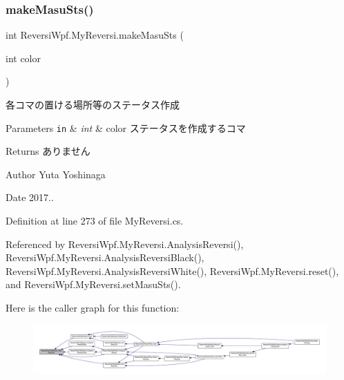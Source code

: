 \subsubsection{\texorpdfstring{make\+Masu\+Sts()}{makeMasuSts()}}
{\footnotesize\ttfamily int Reversi\+Wpf.\+My\+Reversi.\+make\+Masu\+Sts (\begin{DoxyParamCaption}\item[{int}]{color }\end{DoxyParamCaption})\hspace{0.3cm}{\ttfamily [private]}}



各コマの置ける場所等のステータス作成 


\begin{DoxyParams}[1]{Parameters}
\mbox{\tt in}  & {\em int} & color ステータスを作成するコマ \\
\hline
\end{DoxyParams}
\begin{DoxyReturn}{Returns}
ありません 
\end{DoxyReturn}
\begin{DoxyAuthor}{Author}
Yuta Yoshinaga 
\end{DoxyAuthor}
\begin{DoxyDate}{Date}
2017.. 
\end{DoxyDate}


Definition at line 273 of file My\+Reversi.\+cs.



Referenced by Reversi\+Wpf.\+My\+Reversi.\+Analysis\+Reversi(), Reversi\+Wpf.\+My\+Reversi.\+Analysis\+Reversi\+Black(), Reversi\+Wpf.\+My\+Reversi.\+Analysis\+Reversi\+White(), Reversi\+Wpf.\+My\+Reversi.\+reset(), and Reversi\+Wpf.\+My\+Reversi.\+set\+Masu\+Sts().

Here is the caller graph for this function\+:
\nopagebreak
\begin{figure}[H]
\begin{center}
\leavevmode
\includegraphics[width=350pt]{class_reversi_wpf_1_1_my_reversi_a7e4d94600afb1b9d512341b1692769e7_icgraph}
\end{center}
\end{figure}
\mbox{\label{class_reversi_wpf_1_1_my_reversi_a61b1ee2e28cc4050ebbda2e54c7a60b6}} 

